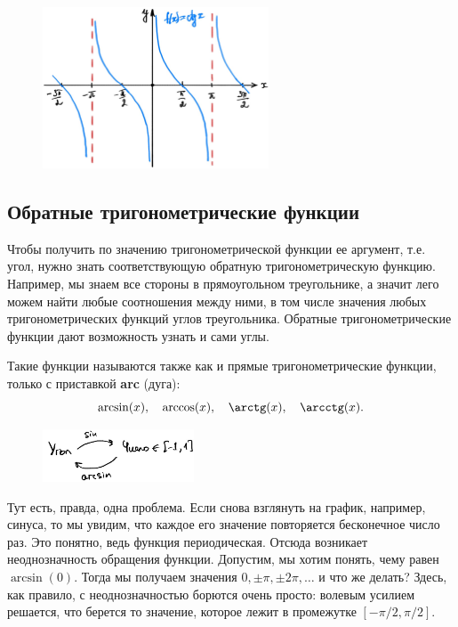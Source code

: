 \documentclass[a4paper,12pt]{article}
\newcounter{th-counter}
\begin{document}
\begin{figure}[H]
    \centering
    \includegraphics[width=0.6\textwidth]{pictures/pct_cotangence_plot.jpg}
\end{figure}

\subsection*{Обратные тригонометрические функции}

Чтобы получить по значению тригонометрической функции ее аргумент, т.е. угол, нужно знать соответствующую обратную тригонометрическую функцию. Например, мы знаем все стороны в прямоугольном треугольнике, а значит лего можем найти любые соотношения между ними, в том числе значения любых тригонометрических функций углов треугольника. Обратные тригонометрические функции дают возможность узнать и сами углы.

Такие функции называются также как и прямые тригонометрические функции, только с приставкой \textbf{arc} (дуга):
\[\arcsin(x), \quad \arccos(x), \quad \arctg(x), \quad \arcctg(x).\]
\begin{figure}[H]
    \centering
    \includegraphics[width=0.4\textwidth]{pictures/pct_inverse_trigonometric.jpg}
\end{figure}

Тут есть, правда, одна проблема. Если снова взглянуть на график, например, синуса, то мы увидим, что каждое его значение повторяется бесконечное число раз. Это понятно, ведь функция периодическая. Отсюда возникает неоднозначность обращения функции. Допустим, мы хотим понять, чему равен $\arcsin(0)$. Тогда мы получаем значения $0, \pm \pi, \pm 2\pi, \ldots$ и что же делать? Здесь, как правило, с неоднозначностью борются очень просто: волевым усилием решается, что берется то значение, которое лежит в промежутке $[-\pi/2, \pi/2]$.
\end{document}
